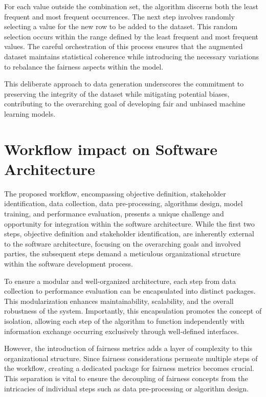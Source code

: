 \documentclass[12pt,a4paper,openright,twoside]{book}
\begin{document}


For each value outside the combination set, the algorithm discerns both the least frequent and most frequent occurrences. The next step involves randomly selecting a value for the new row to be added to the dataset. This random selection occurs within the range defined by the least frequent and most frequent values. The careful orchestration of this process ensures that the augmented dataset maintains statistical coherence while introducing the necessary variations to rebalance the fairness aspects within the model.

This deliberate approach to data generation underscores the commitment to preserving the integrity of the dataset while mitigating potential biases, contributing to the overarching goal of developing fair and unbiased machine learning models.

\section{Workflow impact on Software Architecture}

The proposed workflow, encompassing objective definition, stakeholder identification, data collection, data pre-processing, algorithms design, model training, and performance evaluation, presents a unique challenge and opportunity for integration within the software architecture. While the first two steps, objective definition and stakeholder identification, are inherently external to the software architecture, focusing on the overarching goals and involved parties, the subsequent steps demand a meticulous organizational structure within the software development process.

To ensure a modular and well-organized architecture, each step from data collection to performance evaluation can be encapsulated into distinct packages. This modularization enhances maintainability, scalability, and the overall robustness of the system. Importantly, this encapsulation promotes the concept of isolation, allowing each step of the algorithm to function independently with information exchange occurring exclusively through well-defined interfaces.

However, the introduction of fairness metrics adds a layer of complexity to this organizational structure. Since fairness considerations permeate multiple steps of the workflow, creating a dedicated package for fairness metrics becomes crucial. This separation is vital to ensure the decoupling of fairness concepts from the intricacies of individual steps such as data pre-processing or algorithm design.
\end{document}
